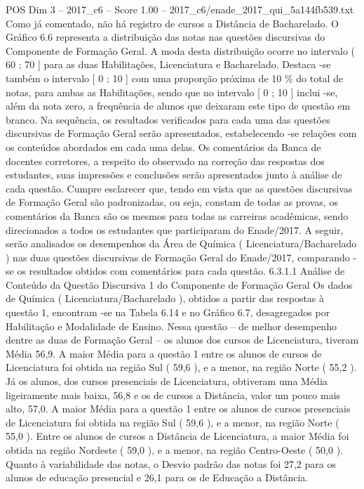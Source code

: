 \begin{textsample}{POS Dim 3 – 2017\_c6 – Score 1.00 – 2017\_c6/enade\_2017\_qui\_5a144fb539.txt}
Como já comentado, não há registro de cursos a Distância de Bacharelado.
O Gráfico 6.6 representa a distribuição das notas nas questões discursivas do Componente de Formação Geral.
A moda desta distribuição ocorre no intervalo ( 60 ; 70 ] para as duas Habilitações, Licenciatura e Bacharelado.
Destaca -se também o intervalo [ 0 ; 10 ] com uma proporção próxima de 10 \% do total de notas, para ambas as Habilitações, sendo que no intervalo [ 0 ; 10 ] inclui -se, além da nota zero, a frequência de alunos que deixaram este tipo de questão em branco.
Na sequência, os resultados verificados para cada uma das questões discursivas de Formação Geral serão apresentados, estabelecendo -se relações com os conteúdos abordados em cada uma delas.
Os comentários da Banca de docentes corretores, a respeito do observado na correção das respostas dos estudantes, suas impressões e conclusões serão apresentados junto à análise de cada questão.
Cumpre esclarecer que, tendo em vista que as questões discursivas de Formação Geral são padronizadas, ou seja, constam de todas as provas, os comentários da Banca são os mesmos para todas as carreiras acadêmicas, sendo direcionados a todos os estudantes que participaram do Enade/2017.
A seguir, serão analisados os desempenhos da Área de Química ( Licenciatura/Bacharelado ) nas duas questões discursivas de Formação Geral do Enade/2017, comparando -se os resultados obtidos com comentários para cada questão. 6.3.1.1 Análise de Conteúdo da Questão Discursiva 1 do Componente de Formação Geral Os dados de Química ( Licenciatura/Bacharelado ), obtidos a partir das respostas à questão 1, encontram -se na Tabela 6.14 e no Gráfico 6.7, desagregados por Habilitação e Modalidade de Ensino.
Nessa questão – de melhor desempenho dentre as duas de Formação Geral – os alunos dos cursos de Licenciatura, tiveram Média 56,9.
A maior Média para a questão 1 entre os alunos de cursos de Licenciatura foi obtida na região Sul ( 59,6 ), e a menor, na região Norte ( 55,2 ).
Já os alunos, dos cursos presenciais de Licenciatura, obtiveram uma Média ligeiramente mais baixa, 56,8 e os de cursos a Distância, valor um pouco mais alto, 57,0.
A maior Média para a questão 1 entre os alunos de cursos presenciais de Licenciatura foi obtida na região Sul ( 59,6 ), e a menor, na região Norte ( 55,0 ).
Entre os alunos de cursos a Distância de Licenciatura, a maior Média foi obtida na região Nordeste ( 59,0 ), e a menor, na região Centro-Oeste ( 50,0 ).
Quanto à variabilidade das notas, o Desvio padrão das notas foi 27,2 para os alunos de educação presencial e 26,1 para os de Educação a Distância.

\end{textsample}
